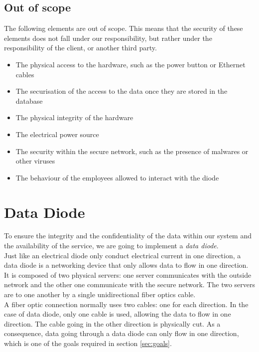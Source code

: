 \documentclass[a4paper,11pt]{article}
\begin{document}
\subsection{Out of scope}
\label{sec:outscope}
The following elements are out of scope. This means that the security of these elements does not fall under our responsibility, but rather under the responsibility of the client, or another third party.

\begin{itemize}
\item{The physical access to the hardware, such as the power button or Ethernet cables}
\item{The securisation of the access to the data once they are stored in the database}
\item{The physical integrity of the hardware}
\item{The electrical power source}
\item{The security within the secure network, such as the presence of malwares or other viruses}
\item{The behaviour of the employees allowed to interact with the diode}
\end{itemize}


\section{Data Diode}
\label{sec:data-diode}
To ensure the integrity and the confidentiality of the data within our system and the availability of the service, we are going to implement a \textit{data diode}.\\

Just like an electrical diode only conduct electrical current in one direction, a data diode is a networking device that only allows data to flow in one direction. It is composed of two physical servers: one server communicates with the outside network and the other one communicate with the secure network. The two servers are to one another by a single unidirectional fiber optics cable.\\

A fiber optic connection normally uses two cables: one for each direction. In the case of 	 data diode, only one cable is used, allowing the data to flow in one direction. The cable going in the other direction is physically cut. As a consequence, data going through a data diode can only flow in one direction, which is one of the goals required in section \ref{sec:goals}.\\
\end{document}
